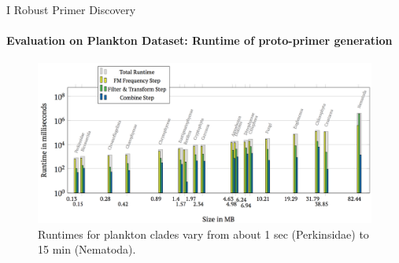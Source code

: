 \documentclass[xcolor=dvipsnames,envcountsect]{beamer}
\begin{document}
\begin{frame}{I Robust Primer Discovery}
\framesubtitle{Evaluation on Plankton Dataset: Runtime of proto-primer generation}
\begin{figure}\centering

\includegraphics[scale=.36]{plankton_runtime}
    \caption{Runtimes for plankton clades vary from about 1 sec (Perkinsidae) to 15 min (Nematoda).}
\end{figure}

\end{frame}

\end{document}
